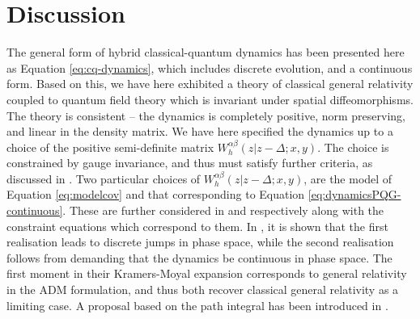 \documentclass[aps,pra,showpacs,citeautoscript,amsmath,amssymb,floatfix,superscriptaddress,bbm, verbatim,amsfonts,changes,10pt,nofootinbib,longbibliography]{revtex4-1}
\def\z{{z}}
\def\dist{{\Delta}}
\def\rate{{W}}
\def\ab{^{\alpha\beta}}
\begin{document}
\section{Discussion}
\label{sec:discussion}

The general form of hybrid classical-quantum dynamics has been presented here as Equation \eqref{eq:cq-dynamics}, which includes discrete evolution, and a continuous form\cite{UCLPawula}. Based on this, we have here exhibited a theory of classical general relativity coupled to quantum field theory which is invariant under spatial diffeomorphisms. The theory is consistent -- the dynamics is completely positive, norm preserving, and linear in the density matrix. We have here specified the dynamics up to a choice of the positive semi-definite matrix $\rate\ab_{h}(\z|\z-\dist;x,y)$.
The choice is constrained by gauge invariance, and thus must satisfy further criteria, as discussed in \cite{UCL2022constraints}. Two particular choices of $\rate\ab_{h}(\z|\z-\dist;x,y)$, are the model of Equation \eqref{eq:modelcov} and that corresponding to Equation \eqref{eq:dynamicsPQG-continuous}. These are further considered in \cite{UCL2022constraints} and \cite{oppenheim2021gravitationally,oppenheim2021constraints} respectively along with the constraint equations which correspond to them.
In \cite{UCLPawula}, it is shown that the first realisation leads to discrete jumps in phase space, while the second realisation follows from demanding that the dynamics be continuous in phase space.  The first moment in their Kramers-Moyal expansion corresponds to general relativity in the ADM formulation, and thus both recover classical general relativity as a limiting case. \label{par:realisations}  A proposal based on the path integral has been introduced in \cite{oppenheim2023covariant}.
\end{document}
